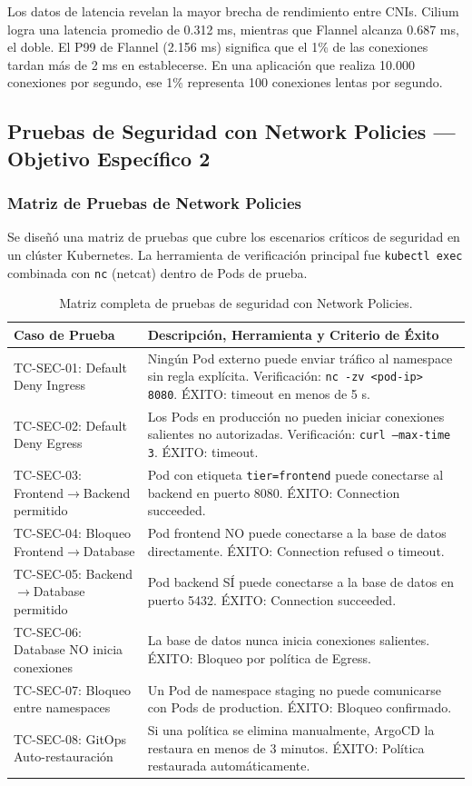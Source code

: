 Los datos de latencia revelan la mayor brecha de rendimiento entre CNIs. Cilium logra una latencia promedio de 0.312 ms, mientras que Flannel alcanza 0.687 ms, el doble. El P99 de Flannel (2.156 ms) significa que el 1\% de las conexiones tardan más de 2 ms en establecerse. En una aplicación que realiza 10.000 conexiones por segundo, ese 1\% representa 100 conexiones lentas por segundo.

\subsection{Pruebas de Seguridad con Network Policies --- Objetivo Específico 2}

\subsubsection{Matriz de Pruebas de Network Policies}

Se diseñó una matriz de pruebas que cubre los escenarios críticos de seguridad en un clúster Kubernetes. La herramienta de verificación principal fue \texttt{kubectl exec} combinada con \texttt{nc} (netcat) dentro de Pods de prueba.

\begin{table}[htbp]
\centering
\scriptsize
\begin{tabularx}{\textwidth}{|Y|Y|}
\hline
\textbf{Caso de Prueba} & \textbf{Descripción, Herramienta y Criterio de Éxito} \\
\hline
TC-SEC-01: Default Deny Ingress & Ningún Pod externo puede enviar tráfico al namespace sin regla explícita. Verificación: \texttt{nc -zv <pod-ip> 8080}. ÉXITO: timeout en menos de 5 s. \\
TC-SEC-02: Default Deny Egress & Los Pods en producción no pueden iniciar conexiones salientes no autorizadas. Verificación: \texttt{curl --max-time 3}. ÉXITO: timeout. \\
TC-SEC-03: Frontend$\rightarrow$Backend permitido & Pod con etiqueta \texttt{tier=frontend} puede conectarse al backend en puerto 8080. ÉXITO: Connection succeeded. \\
TC-SEC-04: Bloqueo Frontend$\rightarrow$Database & Pod frontend NO puede conectarse a la base de datos directamente. ÉXITO: Connection refused o timeout. \\
TC-SEC-05: Backend$\rightarrow$Database permitido & Pod backend SÍ puede conectarse a la base de datos en puerto 5432. ÉXITO: Connection succeeded. \\
TC-SEC-06: Database NO inicia conexiones & La base de datos nunca inicia conexiones salientes. ÉXITO: Bloqueo por política de Egress. \\
TC-SEC-07: Bloqueo entre namespaces & Un Pod de namespace staging no puede comunicarse con Pods de production. ÉXITO: Bloqueo confirmado. \\
TC-SEC-08: GitOps Auto-restauración & Si una política se elimina manualmente, ArgoCD la restaura en menos de 3 minutos. ÉXITO: Política restaurada automáticamente. \\
\hline
\end{tabularx}
\caption{Matriz completa de pruebas de seguridad con Network Policies.}
\end{table}

